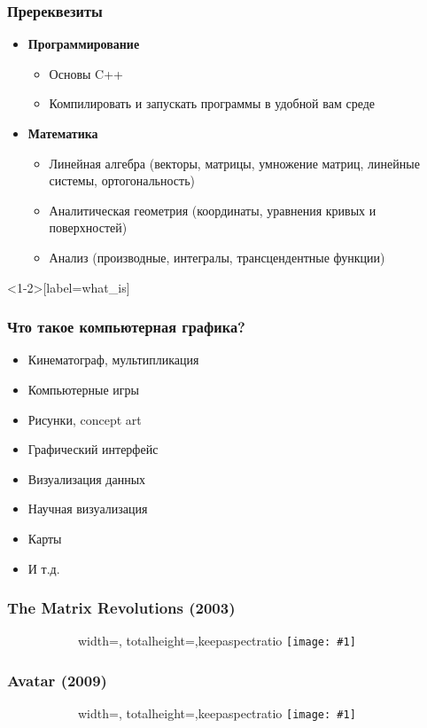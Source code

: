 \documentclass[10pt]{beamer}
\newcommand{\slideimage}[1]{
  \begin{figure}
    \begin{adjustbox}{width=\textwidth, totalheight=\textheight-2\baselineskip-2\baselineskip,keepaspectratio}
      \texttt{[image: \#1]}
    \end{adjustbox}
  \end{figure}
}
\begin{document}
\begin{frame}
\frametitle{Пререквезиты}
\pause
\begin{itemize}
\item \textbf{Программирование}
\pause
\begin{itemize}
\item Основы C++
\pause
\item Компилировать и запускать программы в удобной вам среде
\end{itemize}
\pause
\item \textbf{Математика}
\pause
\begin{itemize}
\item Линейная алгебра (векторы, матрицы, умножение матриц, линейные системы, ортогональность)
\pause
\item Аналитическая геометрия (координаты, уравнения кривых и поверхностей)
\pause
\item Анализ (производные, интегралы, трансцендентные функции)
\end{itemize}
\end{itemize}
\end{frame}

\begin{frame}<1-2>[label=what_is]
\frametitle{Что такое компьютерная графика?}
\begin{itemize}
\pause %
\item Кинематограф, мультипликация
\pause %
\item Компьютерные игры
\pause %
\item Рисунки, concept art
\pause %
\item Графический интерфейс
\pause %
\item Визуализация данных
\pause %
\item Научная визуализация
\pause %
\item Карты
\pause %
\item И т.д.
\end{itemize}
\end{frame}

\begin{frame}
\frametitle{The Matrix Revolutions (2003)}
\begin{figure}
\slideimage{matrix.jpg}
\end{figure}
\end{frame}

\begin{frame}
\frametitle{Avatar (2009)}
\begin{figure}
\slideimage{avatar.jpg}
\end{figure}
\end{frame}
\end{document}
